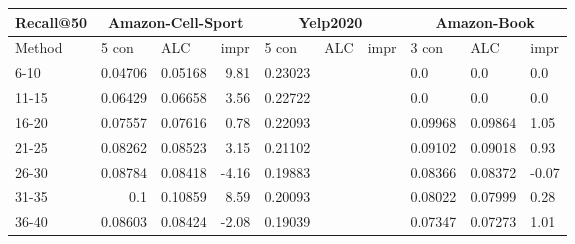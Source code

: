 \begin{table*}[]%
    \centering
    \begin{tabular}{|l|r|r|r||r|r|r||l|l|l|}
        \hline
        Recall@50 & \multicolumn{3}{c||}{Amazon-Cell-Sport} & \multicolumn{3}{c|}{Yelp2020} & \multicolumn{3}{c|}{Amazon-Book}                                                                                                                  \\ \hline
        Method    & \multicolumn{1}{l|}{5 con}              & \multicolumn{1}{l|}{ALC}      & \multicolumn{1}{l||}{impr}       & \multicolumn{1}{l|}{5 con} & \multicolumn{1}{l|}{ALC} & \multicolumn{1}{l||}{impr} & 3 con   & ALC     & impr  \\ \hline
        6-10      & 0.04706                                 & 0.05168                       & 9.81                             & 0.23023                    &                          &                            & 0.0     & 0.0     & 0.0   \\ \hline
        11-15     & 0.06429                                 & 0.06658                       & 3.56                             & 0.22722                    &                          &                            & 0.0     & 0.0     & 0.0   \\ \hline
        16-20     & 0.07557                                 & 0.07616                       & 0.78                             & 0.22093                    &                          &                            & 0.09968 & 0.09864 & 1.05  \\ \hline
        21-25     & 0.08262                                 & 0.08523                       & 3.15                             & 0.21102                    &                          &                            & 0.09102 & 0.09018 & 0.93  \\ \hline
        26-30     & 0.08784                                 & 0.08418                       & -4.16                            & 0.19883                    &                          &                            & 0.08366 & 0.08372 & -0.07 \\ \hline
        31-35     & 0.1                                     & 0.10859                       & 8.59                             & 0.20093                    &                          &                            & 0.08022 & 0.07999 & 0.28  \\ \hline
        36-40     & 0.08603                                 & 0.08424                       & -2.08                            & 0.19039                    &                          &                            & 0.07347 & 0.07273 & 1.01  \\ \hline

\end{tabular}
\end{table*}
